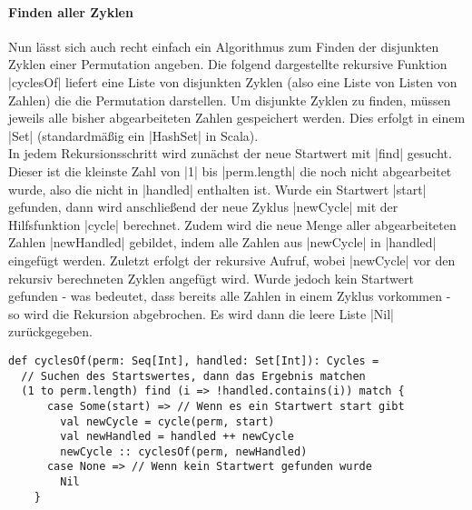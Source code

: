 \paragraph{Finden aller Zyklen}
Nun lässt sich auch recht einfach ein Algorithmus zum Finden der disjunkten Zyklen einer Permutation angeben.
Die folgend dargestellte rekursive Funktion |cyclesOf| liefert eine Liste von disjunkten Zyklen (also eine Liste von Listen von Zahlen)
die die Permutation darstellen. Um disjunkte Zyklen zu finden, müssen jeweils alle bisher abgearbeiteten Zahlen gespeichert werden.
Dies erfolgt in einem |Set| (standardmäßig ein |HashSet| in Scala). \\
In jedem Rekursionsschritt wird zunächst der neue Startwert mit |find| gesucht.
Dieser ist die kleinste Zahl von |1| bis |perm.length| die noch nicht abgearbeitet wurde, also die nicht in |handled| enthalten ist.
Wurde ein Startwert |start| gefunden, dann wird anschließend der neue Zyklus |newCycle| mit der Hilfsfunktion |cycle| berechnet.
Zudem wird die neue Menge aller abgearbeiteten Zahlen |newHandled| gebildet, indem alle Zahlen aus |newCycle| in |handled| eingefügt werden.
Zuletzt erfolgt der rekursive Aufruf, wobei |newCycle| vor den rekursiv berechneten Zyklen angefügt wird.
Wurde jedoch kein Startwert gefunden - was bedeutet, dass bereits alle Zahlen in einem Zyklus vorkommen - so wird die Rekursion abgebrochen.
Es wird dann die leere Liste |Nil| zurückgegeben.
\lstset{language=Scala}
\lstset{basicstyle=\ttfamily}
\begin{lstlisting}
def cyclesOf(perm: Seq[Int], handled: Set[Int]): Cycles =
  // Suchen des Startswertes, dann das Ergebnis matchen
  (1 to perm.length) find (i => !handled.contains(i)) match {
      case Some(start) => // Wenn es ein Startwert start gibt
        val newCycle = cycle(perm, start)
        val newHandled = handled ++ newCycle
        newCycle :: cyclesOf(perm, newHandled)
      case None => // Wenn kein Startwert gefunden wurde
        Nil
    }
\end{lstlisting}
